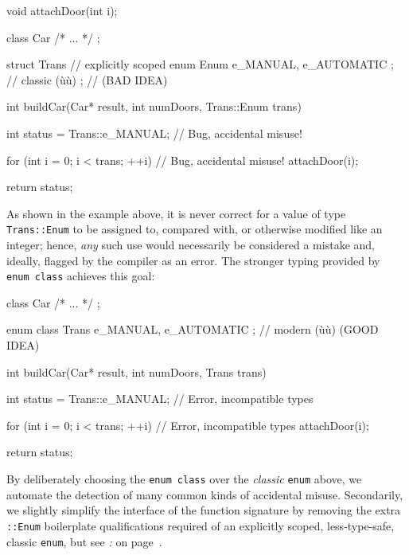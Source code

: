 \begin{emcppshiddenlisting}[emcppsbatch=e5]
void attachDoor(int i);
\end{emcppshiddenlisting}
\begin{emcppslisting}[emcppsbatch=e5]
class Car { /* ... */ };

struct Trans
{                                         // explicitly scoped
    enum Enum { e_MANUAL, e_AUTOMATIC };  // classic (ù{}ù)
};                                        // (BAD IDEA)

int buildCar(Car* result, int numDoors, Trans::Enum trans)
{
    int status = Trans::e_MANUAL;    // Bug, accidental misuse!

    for (int i = 0; i < trans; ++i)  // Bug, accidental misuse!
    {
         attachDoor(i);
    }

    return status;
}
\end{emcppslisting}

\noindent As shown in the example above, it is never correct for a value of type
\texttt{Trans::Enum} to be assigned to, compared with, or otherwise
modified like an integer; hence, \emph{any} such use would necessarily
be considered a mistake and, ideally, flagged by the compiler as an
error. The stronger typing provided by \texttt{enum}~\texttt{class}
achieves this goal:

\begin{emcppslisting}[emcppsignore={Fails to build with all Declarations marked Error}]
class Car { /* ... */ };

enum class Trans { e_MANUAL, e_AUTOMATIC };  // modern (ù{}ù) (GOOD IDEA)

int buildCar(Car* result, int numDoors, Trans trans)
{
    int status = Trans::e_MANUAL;    // Error, incompatible types

    for (int i = 0; i < trans; ++i)  // Error, incompatible types
    {
         attachDoor(i);
    }

    return status;
}
\end{emcppslisting}

\noindent By deliberately choosing the \texttt{enum}~\texttt{class} over the
\emph{classic} \texttt{enum} above, we automate the detection of many common
kinds of accidental misuse. Secondarily, we slightly simplify the interface of the function signature by removing the extra \texttt{::Enum} boilerplate qualifications required of an explicitly
scoped, less-type-safe, classic \texttt{enum}, but see \textit{: } on page~\pageref{strong-typing-of-an-enum-class-can-be-counterproductive}.

